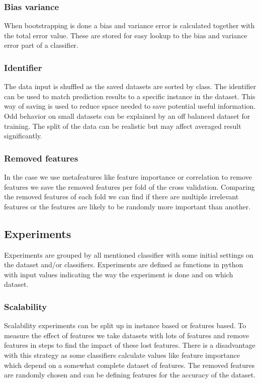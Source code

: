\documentclass[a4paper,10pt]{article}
\begin{document}
\subsubsection{Bias variance}
When bootstrapping is done a bias and variance error is calculated together with the total error value. These are stored for easy lookup to the bias and variance error part of a classifier.

\subsubsection{Identifier}
The data input is shuffled as the saved datasets are sorted by class. The identifier can be used to match prediction results to a specific instance in the dataset. This way of saving is used to reduce space needed to save potential useful information. Odd behavior on small datasets can be explained by an off balanced dataset for training. The split of the data can be realistic but may affect averaged result significantly. 

\subsubsection{Removed features}
In the case we use metafeatures like feature importance or correlation to remove features we save the removed features per fold of the cross validation. Comparing the removed features of each fold we can find if there are multiple irrelevant features or the features are likely to be randomly more important than another.

\subsection{Experiments}
Experiments are grouped by all mentioned classifier with some initial settings on the dataset and/or classifiers. Experiments are defined as functions in python with input values indicating the way the experiment is done and on which dataset.
\subsubsection{Scalability}
Scalability experiments can be split up in instance based or features based. To measure the effect of features we take datasets with lots of features and remove features in steps to find the impact of these lost features. There is a disadvantage with this strategy as some classifiers calculate values like feature importance which depend on a somewhat complete dataset of features. The removed features are randomly chosen and can be defining features for the accuracy of the dataset. 
\end{document}
